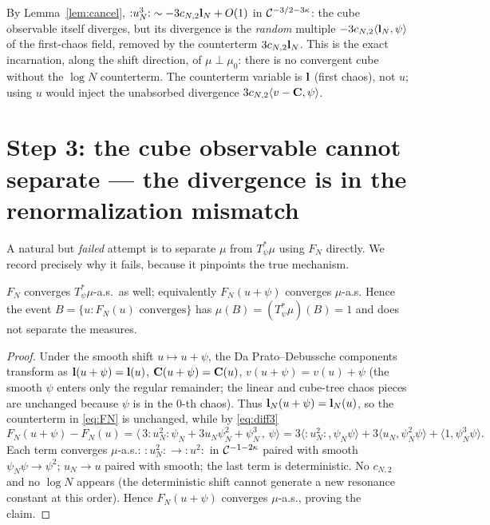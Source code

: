 \begin{remark}
By Lemma~\ref{lem:cancel}, ${:}u_N^3{:}\sim-3c_{N,2}\mathbf{l}_N+O(1)$ in
$\mathcal{C}^{-3/2-3\kappa}$: the cube observable itself diverges, but its divergence is the
\emph{random} multiple $-3c_{N,2}\langle\mathbf{l}_N,\psi\rangle$ of the first-chaos
field, removed by the counterterm $3c_{N,2}\mathbf{l}_N$. This is the exact incarnation,
along the shift direction, of $\mu\perp\mu_0$: there is no convergent cube without the
$\log N$ counterterm. The counterterm variable is $\mathbf{l}$ (first chaos), not $u$;
using $u$ would inject the unabsorbed divergence $3c_{N,2}\langle v-\mathbf{C},\psi\rangle$.
\end{remark}

\section*{Step 3: the cube observable cannot separate --- the divergence is in the renormalization mismatch}

A natural but \emph{failed} attempt is to separate $\mu$ from $T_\psi^*\mu$ using
$F_N$ directly. We record precisely why it fails, because it pinpoints the true
mechanism.

\begin{qonelemma}\label{lem:nosep}
$F_N$ converges $T_\psi^*\mu$-a.s.\ as well; equivalently $F_N(u+\psi)$ converges
$\mu$-a.s. Hence the event $B=\{u:F_N(u)\text{ converges}\}$ has
$\mu(B)=(T_\psi^*\mu)(B)=1$ and does not separate the measures.
\end{qonelemma}
\begin{proof}
Under the smooth shift $u\mapsto u+\psi$, the Da Prato--Debussche components transform
as $\mathbf{l}(u+\psi)=\mathbf{l}(u)$, $\mathbf{C}(u+\psi)=\mathbf{C}(u)$,
$v(u+\psi)=v(u)+\psi$ (the smooth $\psi$ enters only the regular remainder; the linear
and cube-tree chaos pieces are unchanged because $\psi$ is in the $0$-th chaos). Thus
$\mathbf{l}_N(u+\psi)=\mathbf{l}_N(u)$, so the counterterm in \eqref{eq:FN} is unchanged,
while by \eqref{eq:diff3}
\[
F_N(u+\psi)-F_N(u)=\bigl\langle\,3{:}u_N^2{:}\psi_N+3u_N\psi_N^2+\psi_N^3\,,\,\psi\bigr\rangle
=3\langle{:}u_N^2{:},\psi_N\psi\rangle+3\langle u_N,\psi_N^2\psi\rangle+\langle1,\psi_N^3\psi\rangle .
\]
Each term converges $\mu$-a.s.: ${:}u_N^2{:}\to{:}u^2{:}$ in $\mathcal{C}^{-1-2\kappa}$
paired with smooth $\psi_N\psi\to\psi^2$; $u_N\to u$ paired with smooth; the last term
is deterministic. No $c_{N,2}$ and no $\log N$ appears (the deterministic shift cannot
generate a new resonance constant at this order). Hence $F_N(u+\psi)$ converges
$\mu$-a.s., proving the claim.
\end{proof}

